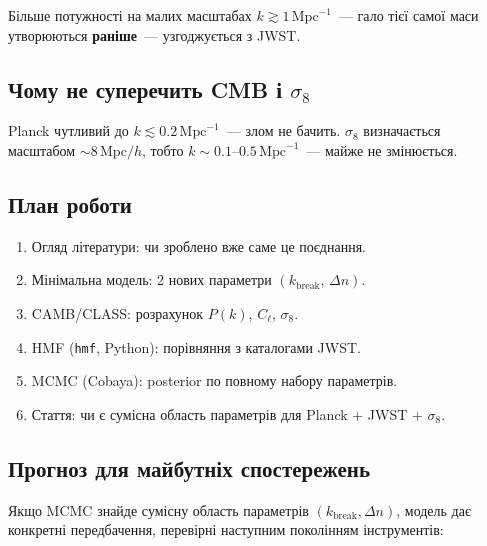 \documentclass[12pt, a4paper]{article}
\begin{document}
Більше потужності на малих масштабах $k \gtrsim 1\,\mathrm{Mpc}^{-1}$~---
гало тієї самої маси утворюються \textbf{раніше}~--- узгоджується з JWST.

\subsection{Чому не суперечить CMB і $\sigma_8$}

Planck чутливий до $k \lesssim 0.2\,\mathrm{Mpc}^{-1}$~--- злом не бачить.
$\sigma_8$ визначається масштабом $\sim 8\,\mathrm{Mpc}/h$, тобто
$k \sim 0.1$--$0.5\,\mathrm{Mpc}^{-1}$~--- майже не змінюється.

\subsection{План роботи}

\begin{enumerate}
  \item Огляд літератури: чи зроблено вже саме це поєднання.
  \item Мінімальна модель: 2 нових параметри $(k_\mathrm{break},\, \Delta n)$.
  \item CAMB/CLASS: розрахунок $P(k)$, $C_\ell$, $\sigma_8$.
  \item HMF (\texttt{hmf}, Python): порівняння з каталогами JWST.
  \item MCMC (Cobaya): posterior по повному набору параметрів.
  \item Стаття: чи є сумісна область параметрів для Planck + JWST + $\sigma_8$.
\end{enumerate}

\subsection{Прогноз для майбутніх спостережень}

Якщо MCMC знайде сумісну область параметрів
$(k_\mathrm{break}, \Delta n)$, модель дає конкретні
передбачення, перевірні наступним поколінням інструментів:
\end{document}
